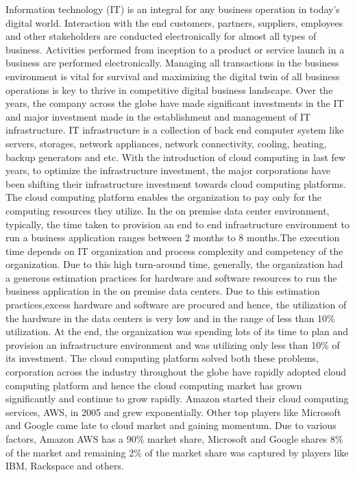 \documentclass[fleqn,10pt]{SelfArx} %
\begin{document}
Information technology (IT) is an integral for any business operation in today's digital world. Interaction with the end customers, partners, suppliers, employees and other stakeholders are conducted electronically for almost all types of business. Activities performed from inception to a product or service launch in a business are performed electronically. Managing all transactions in the business environment is vital for survival and maximizing the digital twin of all business operations is key to thrive in competitive digital business landscape. Over the years, the company across the globe have made significant investments in the IT and major investment made in the establishment and management of IT infrastructure. IT infrastructure is a collection of back end computer system like servers, storages, network appliances, network connectivity, cooling, heating, backup generators and etc. 
With the introduction of cloud computing in last few years, to optimize the infrastructure investment, the major corporations have been shifting their infrastructure investment towards cloud computing platforms. The cloud computing platform enables the organization to pay only for the computing resources they utilize. In the on premise data center environment, typically, the time taken to provision an end to end infrastructure environment to run a business application ranges between 2 months to 8 months.The execution time  depends on IT organization and process complexity and competency of the organization. Due to this high turn-around time, generally, the organization had a generous estimation practices for hardware and software resources to run the business application in the on premise data centers.  Due to this estimation practices,excess hardware and software are procured and hence, the utilization of the hardware in the data centers is very low and in the range of less than 10\% utilization. At the end, the organization was spending lots of its time to plan and provision an infrastructure environment and was utilizing only less than 10\% of its investment. The cloud computing platform solved both these problems, corporation across the industry throughout the globe have rapidly adopted cloud computing platform and hence the cloud computing market has grown significantly and continue to grow rapidly. 
 Amazon started their cloud computing services, AWS, in 2005 and grew exponentially. Other top players like Microsoft and Google came late to cloud market and gaining momentum. Due to various factors, Amazon AWS has a 90\% market share, Microsoft and Google shares 8\% of the market and remaining 2\% of the market share was captured by players like IBM, Rackspace and others. 
\end{document}

